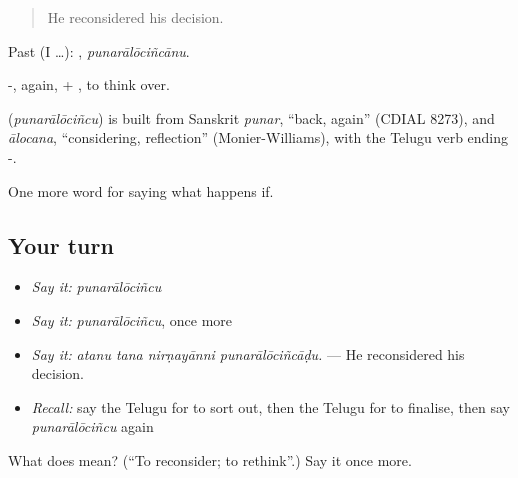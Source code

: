 \begin{quote}
He reconsidered his decision.
\end{quote}

Past (I …): , \emph{punarālōciñcānu}.

-, again, + , to think over.

\begin{cousinweb}
\textbf{} (\emph{punarālōciñcu}) is built from Sanskrit \emph{punar}, \textquotedblleft{}back, again\textquotedblright{} (CDIAL 8273), and \emph{ālocana}, \textquotedblleft{}considering, reflection\textquotedblright{} (Monier-Williams), with the Telugu verb ending -.
\end{cousinweb}

\begin{grammarlens}[title={What you've built}]
One more word for saying what happens if.
\end{grammarlens}

\subsection*{Your turn}
\begin{itemize}
\raggedright
  \item \emph{Say it:} \emph{punarālōciñcu}
  \item \emph{Say it:} \emph{punarālōciñcu}, once more
  \item \emph{Say it:} \emph{atanu tana nirṇayānni punarālōciñcāḍu.} — He reconsidered his decision.
  \item \emph{Recall:} say the Telugu for to sort out, then the Telugu for to finalise, then say \emph{punarālōciñcu} again
\end{itemize}

\begin{tcolorbox}[breakable,colback=teal!4,colframe=teal!35!black,title={Before you move on}]
What does  mean? (\textquotedblleft{}To reconsider; to rethink\textquotedblright{}.) Say it once more.
\end{tcolorbox}
